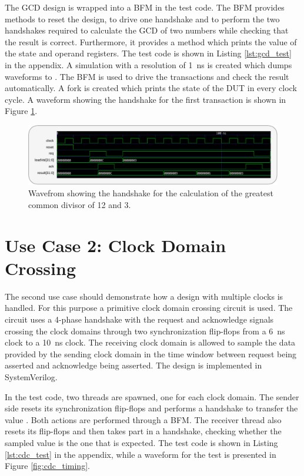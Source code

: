 The GCD design is wrapped into a BFM in the test code. The BFM provides methods to reset the design, to drive one
handshake and to perform the two handshakes required to calculate the GCD of two numbers while checking that the
result is correct. Furthermore, it provides a method which prints the value of the state and operand registers. The
test code is shown in Listing \ref{lst:gcd_test} in the appendix. A simulation with a resolution of \SI{1}{ns} is
created which dumps waveforms to . The BFM is used to drive the transactions and check the result
automatically. A fork is created which prints the state of the DUT in every clock cycle. A waveform showing the
handshake for the first transaction is shown in Figure \ref{fig:gcd_timing}.

\begin{figure}[t]
  \centering
  \includegraphics[width=\textwidth]{diagrams/gcd_timing.pdf}
  \caption{Wavefrom showing the handshake for the calculation of the greatest common divisor of 12 and 3.}
  \label{fig:gcd_timing}
\end{figure}

\section{Use Case 2: Clock Domain Crossing} %

The second use case should demonstrate how a design with multiple clocks is handled. For this purpose a primitive
clock domain crossing circuit is used. The circuit uses a 4-phase handshake with the request and acknowledge signals
crossing the clock domains through two synchronization flip-flops from a \SI{6}{ns} clock to a \SI{10}{ns} clock. The
receiving clock domain is allowed to sample the data provided by the sending clock domain in the time window between
request being asserted and acknowledge being asserted. The design is implemented in SystemVerilog.

In the test code, two threads are spawned, one for each clock domain. The sender side resets its synchronization
flip-flops and performs a handshake to transfer the value . Both actions are performed through a BFM.
The receiver thread also resets its flip-flops and then takes part in a handshake, checking whether the sampled value
is the one that is expected. The test code is shown in Listing \ref{lst:cdc_test} in the appendix, while a waveform
for the test is presented in Figure \ref{fig:cdc_timing}.


